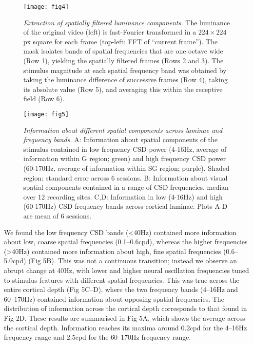 \begin{figure}[htbp]
\centering \texttt{[image: fig4]}
%
\caption{%
\textit{Extraction of spatially filtered luminance components.}
The luminance of the original video (left) is 
fast-Fourier transformed in a $224 \times 224$ px square for each frame (top-left: \ac{FFT} of 
``current frame'').
The mask isolates bands of spatial frequencies that are one octave wide (Row 1), yielding 
the spatially filtered frames (Rows 2 and 3).
The stimulus magnitude at each spatial frequency band was obtained 
by taking the luminance difference of successive frames (Row 4), 
taking its absolute value (Row 5), 
and averaging this within the receptive field (Row 6).
}%
\label{fig:lam_4}
%
\end{figure}

\begin{figure}[htbp]
\centering \texttt{[image: fig5]}
%
\caption{%
\textit{Information about different spatial components across laminae and frequency bands.}
A: Information about spatial components of the stimulus contained in 
low frequency \ac{CSD} power (4-16Hz, average of information within \ac{G} region; green) and high 
frequency \ac{CSD} power (60-170Hz, average of information within \ac{SG} region; purple).
Shaded region: standard error across 6 sessions.
B: Information about visual spatial components contained in a range of \ac{CSD} frequencies, median over 12 recording sites.
C,D: Information in low (4-16Hz) and high (60-170Hz) 
\ac{CSD} frequency bands across cortical laminae.
Plots A-D are mean of 6 sessions.}%
\label{fig:lam_5}
%
\end{figure}

We found the low frequency \ac{CSD} bands ({\textless}40Hz) contained more information about low, coarse spatial frequencies (0.1--0.6cpd), whereas the higher frequencies ({\textgreater}40Hz) contained more information about high, fine spatial frequencies (0.6--5.0cpd) (Fig 5B).
This was not a continuous transition; instead we observe an abrupt change at 40Hz, with lower and higher neural oscillation frequencies tuned to stimulus features with different spatial frequencies.
This was true across the entire cortical depth (Fig 5C--D), where the two frequency bands (4--16Hz and 60--170Hz) contained information about opposing spatial frequencies.
The distribution of information across the cortical depth corresponds to that found in Fig 2D.
These results are summarised in Fig 5A, which shows the average across the cortical depth.
Information reaches its maxima around 0.2cpd for the 4--16Hz frequency range and 2.5cpd for the 60--170Hz frequency range.

